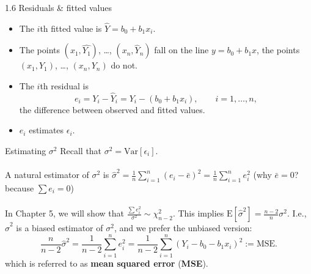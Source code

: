 \documentclass{beamer}
\newcommand{\E}{\mathrm{E}}
\newcommand{\Var}{\mathrm{Var}}
\begin{document}
\begin{frame}{1.6 Residuals \& fitted values}
\begin{itemize}
\item The $i$th \alert{fitted value} is $\hat{Y}=b_0+b_1 x_i$.
\item The points $(x_1, \hat{Y_1})$, \ldots, $(x_n, \hat{Y}_n)$ fall on the line $y=b_0+b_1 x$, the points $(x_1, Y_1)$, \ldots, $(x_n, Y_n)$ do not.
\item The $i$th \alert{residual} is
$$
e_i=Y_i-\hat{Y}_i=Y_i-(b_0+b_1 x_i),\qquad i=1,\ldots,n,
$$
the difference between observed and fitted values.
\item $e_i$ estimates $\epsilon_i$.
\end{itemize}
\end{frame}
\fi



\begin{frame}{Estimating $\sigma^2$}
Recall that $\sigma^2=\Var[\epsilon_i]$.\\~\\

\pause A natural estimator of $\sigma^2$ is \pause $
\hat{\sigma}^2=\frac1n\sum_{i=1}^n (e_i-\bar{e})^2=\frac1n\sum_{i=1}^n e_i^2$ \pause (why $\bar{e}=0$? \pause because $\sum e_i=0$)\\~\\

\pause In Chapter 5, we will show that $\frac{\sum e_i^2}{\sigma^2}\sim\chi^2_{n-2}$. This implies $\E[\hat{\sigma}^2]=\frac{n-2}{n}\sigma^2$.
\pause I.e., $\hat{\sigma}^2$ is a biased estimator of $\sigma^2$, and we prefer the unbiased version:
$$
\frac{n}{n-2}\hat{\sigma}^2=\frac1{n-2}\sum_{i=1}^n e_i^2=\frac{1}{n-2}\sum_{i=1}^n(Y_i-b_0-b_1 x_i)^2:=\mathrm{MSE}.
$$
which is referred to as \textbf{mean squared error} (\textbf{MSE}).
\end{frame}
\end{document}
